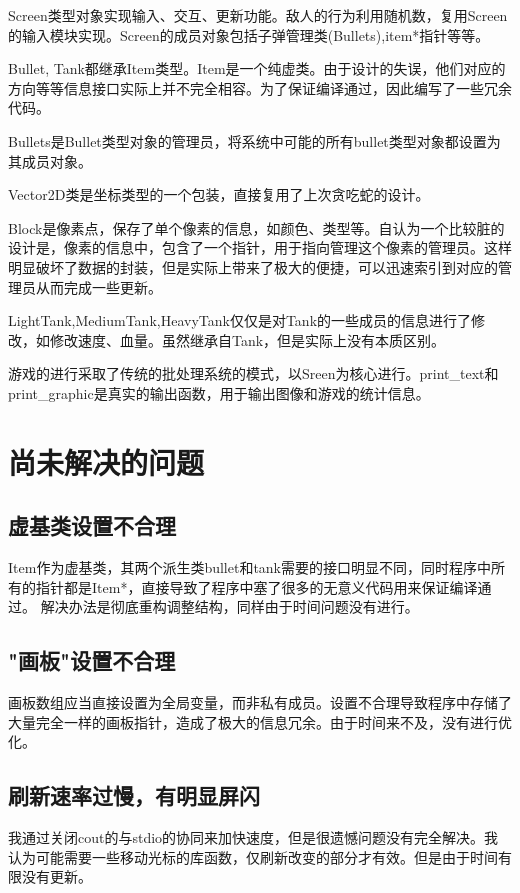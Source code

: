 \documentclass[UTF8]{ctexart}
\begin{document}
    Screen类型对象实现输入、交互、更新功能。敌人的行为利用随机数，复用Screen的输入模块实现。Screen的成员对象包括子弹管理类(Bullets),item*指针等等。

    Bullet, Tank都继承Item类型。Item是一个纯虚类。由于设计的失误，他们对应的方向等等信息接口实际上并不完全相容。为了保证编译通过，因此编写了一些冗余代码。

    Bullets是Bullet类型对象的管理员，将系统中可能的所有bullet类型对象都设置为其成员对象。

    Vector2D类是坐标类型的一个包装，直接复用了上次贪吃蛇的设计。

    Block是像素点，保存了单个像素的信息，如颜色、类型等。自认为一个比较脏的设计是，像素的信息中，包含了一个指针，用于指向管理这个像素的管理员。这样明显破坏了数据的封装，但是实际上带来了极大的便捷，可以迅速索引到对应的管理员从而完成一些更新。

    LightTank,MediumTank,HeavyTank仅仅是对Tank的一些成员的信息进行了修改，如修改速度、血量。虽然继承自Tank，但是实际上没有本质区别。


    游戏的进行采取了传统的批处理系统的模式，以Sreen为核心进行。print\_text和print\_graphic是真实的输出函数，用于输出图像和游戏的统计信息。

\section{尚未解决的问题}
\subsection{虚基类设置不合理}
    Item作为虚基类，其两个派生类bullet和tank需要的接口明显不同，同时程序中所有的指针都是Item*，直接导致了程序中塞了很多的无意义代码用来保证编译通过。
    解决办法是彻底重构调整结构，同样由于时间问题没有进行。
\subsection{"画板"设置不合理}
    画板数组应当直接设置为全局变量，而非私有成员。设置不合理导致程序中存储了大量完全一样的画板指针，造成了极大的信息冗余。由于时间来不及，没有进行优化。

\subsection{刷新速率过慢，有明显屏闪}
    我通过关闭cout的与stdio的协同来加快速度，但是很遗憾问题没有完全解决。我认为可能需要一些移动光标的库函数，仅刷新改变的部分才有效。但是由于时间有限没有更新。    
\end{document}
